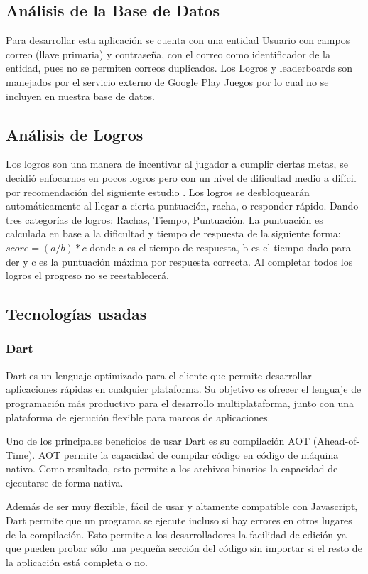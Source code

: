 \documentclass{article}
\begin{document}
\subsection{Análisis de la Base de Datos}%
Para desarrollar esta aplicación se cuenta con una entidad Usuario con campos correo (llave primaria) y contraseña, con el correo como identificador de la entidad, pues no se permiten correos duplicados. Los Logros y leaderboards son manejados por el servicio externo de Google Play Juegos por lo cual no se incluyen en nuestra base de datos.

\subsection{Análisis de Logros}
Los logros son una manera de incentivar al jugador a cumplir ciertas metas, se decidió enfocarnos en pocos logros pero con un nivel de dificultad medio a difícil por recomendación del siguiente estudio \cite{groening2019achievement}.
Los logros se desbloquearán automáticamente al llegar a cierta puntuación, racha, o  responder rápido. Dando tres categorías de logros: Rachas, Tiempo, Puntuación. La puntuación es calculada en base a la dificultad y tiempo de respuesta de la siguiente forma: \(score = (a/b ) * c\) donde a es el tiempo de respuesta, b es el tiempo dado para 
der y c es la puntuación máxima por respuesta correcta.   Al completar todos los logros el progreso no se reestablecerá. 


\subsection{Tecnologías usadas}
\subsubsection{Dart}
Dart es un lenguaje optimizado para el cliente que permite desarrollar 
aplicaciones rápidas en cualquier plataforma. Su objetivo es ofrecer el 
lenguaje de programación más productivo para el desarrollo multiplataforma, 
junto con una plataforma de ejecución flexible para marcos de aplicaciones.

Uno de los principales beneficios de usar Dart es su compilación AOT 
(Ahead-of-Time). AOT permite la capacidad de compilar código en código de 
máquina nativo. Como resultado, esto permite a los archivos binarios la 
capacidad de ejecutarse de forma nativa.

Además de ser muy flexible, fácil de usar y altamente compatible con Javascript, 
Dart permite que un programa se ejecute incluso si hay errores en otros lugares 
de la compilación. Esto permite a los desarrolladores la facilidad de edición 
ya que pueden probar sólo una pequeña sección del código sin importar si el 
resto de la aplicación está completa o no. 
\end{document}
